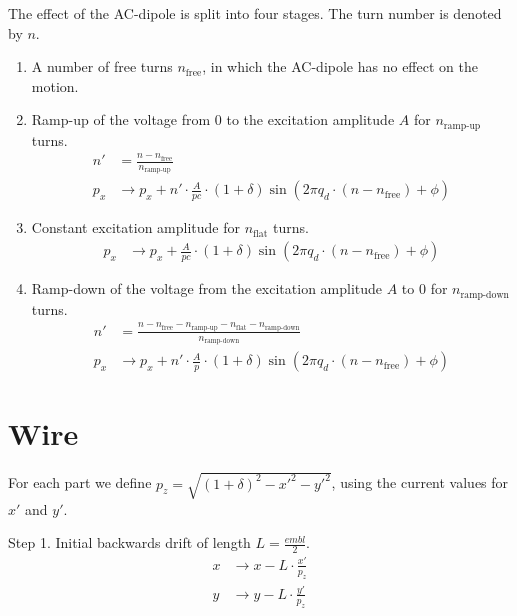 \documentclass[english]{article}
\begin{document}
The effect of the AC-dipole is split into four stages. The turn number is denoted by $n$.
\begin{enumerate}
  \item A number of free turns $n_{\text{free}}$, in which the AC-dipole has no effect on the motion.
  \item Ramp-up of the voltage from $0$ to the excitation amplitude $A$ for $n_{\text{ramp-up}}$ turns.
        \begin{align*}
            n' &= \frac{n-n_{\text{free}}}{n_{\text{ramp-up}}} \\
            p_x &\to p_x + n' \cdot \frac{A}{pc} \cdot(1+\delta) \sin\left(2\pi q_d\cdot(n-n_{\text{free}})+\phi\right)
        \end{align*}
  \item Constant excitation amplitude for $n_{\text{flat}}$ turns.
        \begin{align*}
            p_x &\to p_x + \frac{A}{pc}\cdot(1+\delta)\sin\left(2\pi q_d\cdot(n-n_{\text{free}})+\phi\right)
        \end{align*}
  \item Ramp-down of the voltage from the excitation amplitude $A$ to $0$ for $n_{\text{ramp-down}}$ turns.
        \begin{align*}
            n' &= \frac{n-n_{\text{free}}-n_{\text{ramp-up}}-n_{\text{flat}}-n_{\text{ramp-down}}}{n_{\text{ramp-down}}} \\
            p_x &\to p_x + n' \cdot \frac{A}{p} \cdot(1+\delta) \sin\left(2\pi q_d\cdot(n-n_{\text{free}})+\phi\right)
        \end{align*}
\end{enumerate}

\section{Wire}
For each part we define $p_z=\sqrt{(1+\delta)^2-x'^2-y'^2}$, using the current values for $x'$ and $y'$.

Step 1. Initial backwards drift of length $L=\frac{embl}{2}$.
\begin{align*}
	x &\to x - L\cdot\frac{x'}{p_z} \\
    y &\to y - L\cdot\frac{y'}{p_z}
\end{align*}
\end{document}
